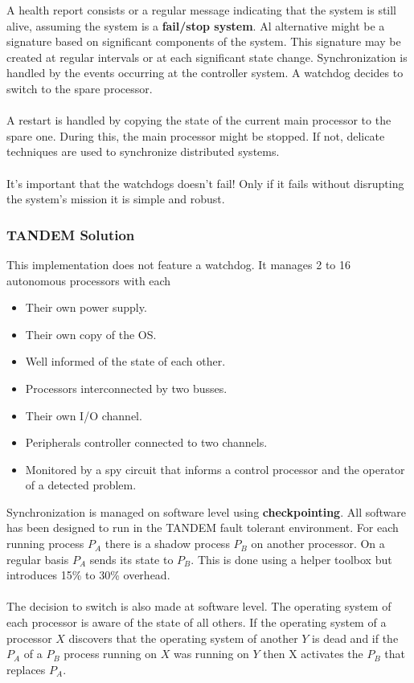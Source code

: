 \documentclass[../main.tex]{subfiles}
\begin{document}
A health report consists or a regular message indicating that the system is still alive, assuming the system is a \textbf{fail/stop system}. Al alternative might be a signature based on significant components of the system. This signature may be created at regular intervals or at each significant state change. Synchronization is handled by the events occurring at the controller system. A watchdog decides to switch to the spare processor. 
\\\\
A restart is handled by copying the state of the current main processor to the spare one. During this, the main processor might be stopped. If not, delicate techniques are used to synchronize distributed systems.
\\\\
It's important that the watchdogs doesn't fail! Only if it fails without disrupting the system's mission it is simple and robust.


\subsubsection{TANDEM Solution}
This implementation does not feature a watchdog. It manages 2 to 16 autonomous processors with each 
\begin{multicols}{2}
\begin{itemize}
	\item Their own power supply.
	\item Their own copy of the OS.
	\item Well informed of the state of each other.
	\item Processors interconnected by two busses.
	\item Their own I/O channel.
	\item Peripherals controller connected to two channels.
	\item Monitored by a spy circuit that informs a control processor and the operator of a detected problem.
\end{itemize}
\end{multicols}

Synchronization is managed on software level using \textbf{checkpointing}. All software has been designed to run in the TANDEM fault tolerant environment. For each running process $P_A$ there is a shadow process $P_B$ on another processor. On a regular basis $P_A$ sends its state to $P_B$. This is done using a helper toolbox but introduces 15\% to 30\% overhead.
\\\\
The decision to switch is also made at software level. The operating system of each processor is aware of the state of all others. If the operating system of a processor $X$ discovers that the operating system of another $Y$ is dead and if the $P_A$ of a $P_B$ process running on $X$ was running on $Y$ then X activates the $P_B$ that replaces $P_A$. 
\end{document}
